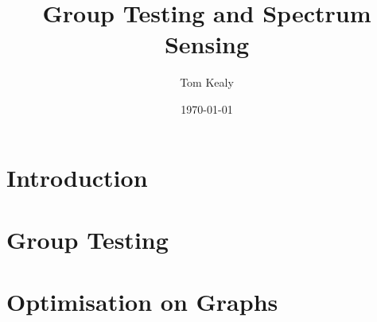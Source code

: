 \documentclass[titlepage]{article}
\begin{document}
\nocite{*}
\title{Group Testing and Spectrum Sensing}
\date{\today}
\author{Tom Kealy}
\maketitle
\part{Introduction}

\part{Group Testing}

\part{Optimisation on Graphs}



\end{document}
